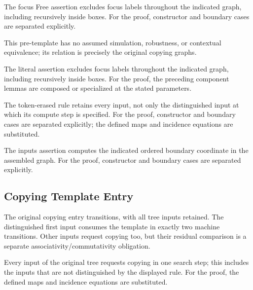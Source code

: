 The focus Free assertion excludes focus labels throughout the indicated graph, including recursively inside boxes.
For the proof, constructor and boundary cases are separated explicitly.
\par{}

This pre-template has no assumed simulation, robustness, or contextual equivalence; its relation is precisely the original copying graphs.
\par{}

The literal assertion excludes focus labels throughout the indicated graph, including recursively inside boxes.
For the proof, the preceding component lemmas are composed or specialized at the stated parameters.
\par{}

The token-erased rule retains every input, not only the distinguished input at which its compute step is specified.
For the proof, constructor and boundary cases are separated explicitly; the defined maps and incidence equations are substituted.
\par{}

The inputs assertion computes the indicated ordered boundary coordinate in the assembled graph.
For the proof, constructor and boundary cases are separated explicitly.
\par{}

\subsection{Copying Template Entry}
The original copying entry transitions, with all tree inputs retained. The distinguished first input consumes the template in exactly two machine transitions. Other inputs request copying too, but their residual comparison is a separate associativity/commutativity obligation.

Every input of the original tree requests copying in one search step; this includes the inputs that are not distinguished by the displayed rule.
For the proof, the defined maps and incidence equations are substituted.
\par{}

